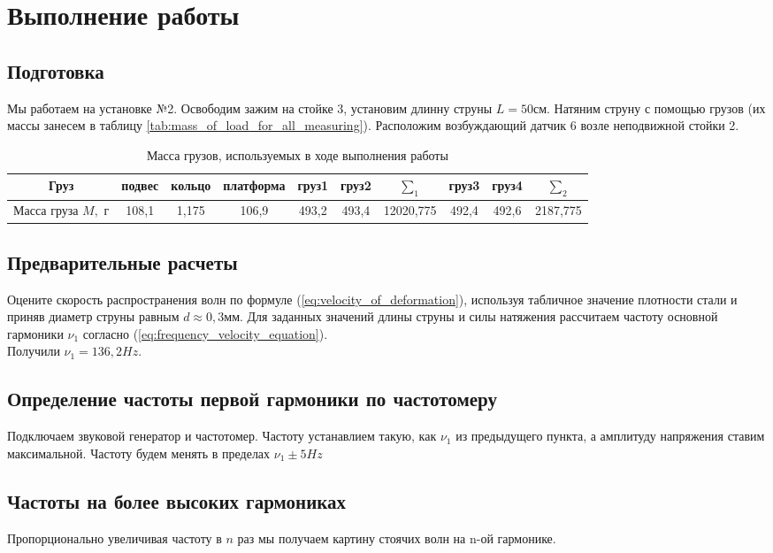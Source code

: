 \documentclass[13pt,a4paper]{article}
\begin{document}
\section{Выполнение работы}


\subsection{Подготовка}
Мы работаем на установке №2. Освободим зажим на стойке 3, установим длинну струны $L=50$см. Натяним струну с помощью грузов (их массы занесем в таблицу \ref{tab:mass_of_load_for_all_measuring}). Расположим возбуждающий датчик 6 возле неподвижной стойки 2.

\begin{table}[h!]
\centering
\begin{tabular}{|c|c|c|c|c|c|c|c|c|c|}
\hline
Груз    & подвес   & кольцо     & платформа     & груз1     & груз2  & $\sum_{1}$  & груз3     & груз4   & $\sum_{2}$  \\ \hline
Масса груза $M,$ г & 108,1 & 1,175 & 106,9 & 493,2 & 493,4 &  12020,775 & 492,4 & 492,6 & 2187,775 \\ \hline
\end{tabular}
\caption{Масса грузов, используемых в ходе выполнения работы}
\label{tab:mass_of_load}
\end{table}


\subsection{Предварительные расчеты}
Оцените скорость распространения волн по формуле (\ref{eq:velocity_of_deformation}), используя табличное значение плотности стали и приняв диаметр струны равным $d\approx0,3$мм. Для заданных значений длины струны и силы натяжения рассчитаем частоту основной гармоники $\nu_{1}$ согласно (\ref{eq:frequency_velocity_equation}).\\
Получили $\nu_{1}=136,2 Hz$.


\subsection{Определение частоты первой гармоники по частотомеру}
Подключаем звуковой генератор и частотомер. Частоту устанавлием такую, как $\nu_{1}$ из предыдущего пункта, а амплитуду напряжения ставим максимальной. Частоту будем менять в пределах $\nu_{1}\pm5 Hz$


\subsection{Частоты на более высоких гармониках}
Пропорционально увеличивая частоту в $n$ раз мы получаем картину стоячих волн на n-ой гармонике. 
\end{document}
